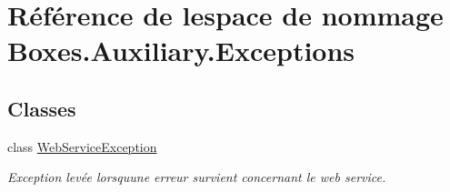 \hypertarget{namespace_boxes_1_1_auxiliary_1_1_exceptions}{}\section{Référence de l\textquotesingle{}espace de nommage Boxes.\+Auxiliary.\+Exceptions}
\label{namespace_boxes_1_1_auxiliary_1_1_exceptions}
\subsection*{Classes}
\begin{DoxyCompactItemize}
\item 
class \hyperlink{class_boxes_1_1_auxiliary_1_1_exceptions_1_1_web_service_exception}{Web\+Service\+Exception}
\begin{DoxyCompactList}\small\item\em Exception levée lorsqu\textquotesingle{}une erreur survient concernant le web service. \end{DoxyCompactList}\end{DoxyCompactItemize}
